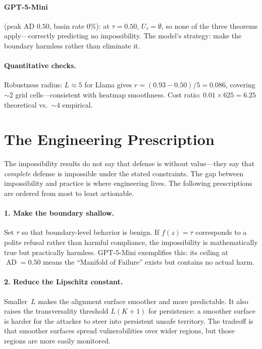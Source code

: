\documentclass[11pt]{article}
\newcommand{\AD}{\operatorname{AD}}
\begin{document}
\paragraph{GPT-5-Mini} (peak AD $0.50$, basin rate $0\%$): at
$\tau = 0.50$, $U_\tau = \emptyset$, so none of the three theorems
apply---correctly predicting no impossibility. The model's strategy:
make the boundary harmless rather than eliminate it.

\paragraph{Quantitative checks.}
Robustness radius: $L \approx 5$ for Llama gives
$r = (0.93-0.50)/5 = 0.086$, covering $\sim$2 grid cells---consistent
with heatmap smoothness. Cost ratio: $0.01 \times 625 = 6.25$
theoretical vs.\ ${\sim}4$ empirical.


\section{The Engineering Prescription}
\label{sec:engineering}

The impossibility results do not say that defense is without value---they
say that \emph{complete} defense is impossible under the stated constraints.
The gap between impossibility and practice is where engineering lives.
The following prescriptions are ordered from most to least actionable.

\paragraph{1. Make the boundary shallow.}
Set $\tau$ so that boundary-level behavior is benign. If $f(z) = \tau$
corresponds to a polite refusal rather than harmful compliance, the
impossibility is mathematically true but practically harmless.
GPT-5-Mini exemplifies this: its ceiling at $\AD = 0.50$ means the
``Manifold of Failure'' exists but contains no actual harm.

\paragraph{2. Reduce the Lipschitz constant.}
Smaller~$L$ makes the alignment surface smoother and more predictable.
It also raises the transversality threshold $L(K+1)$ for persistence: a
smoother surface is harder for the attacker to steer into persistent
unsafe territory. The tradeoff is that smoother surfaces spread
vulnerabilities over wider regions, but those regions are more easily
monitored.
\end{document}

